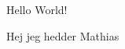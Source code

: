 \documentclass[a4paper,11pt]{memoir}
\begin{document}
Hello World!

Hej jeg hedder Mathias 
\end{document}
